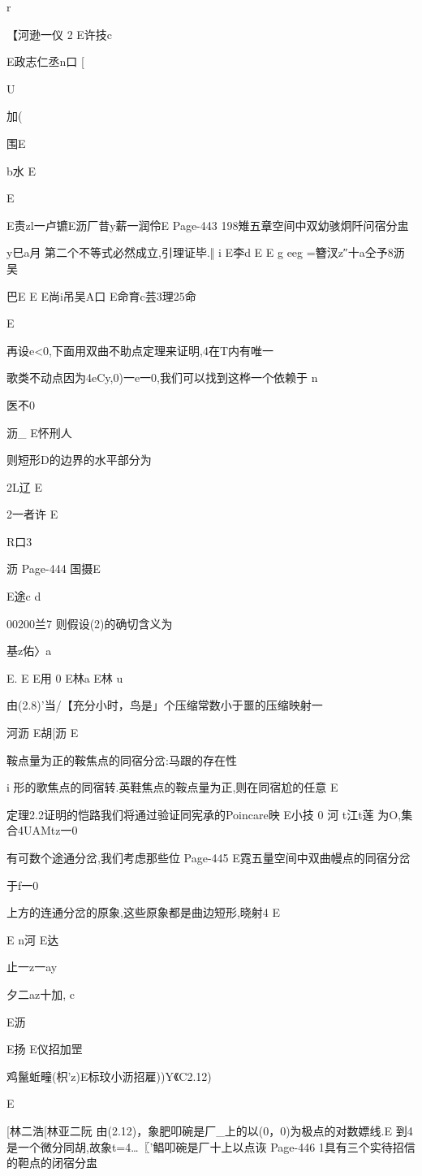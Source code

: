 {{{{{{{{r

【河逊一仪
2
E许技c

E政志仁丞n口
[

U

加(

围E

b水
E

E

E责zl一卢镳E沥厂昔y薪一润伶E
Page-443
198雉五章空间中双幼骇炯阡问宿分盅

y巳a月
第二个不等式必然成立,引理证毕.‖
i
E李d
E
E
g
eeg
=簪汊z″十a仝予8沥吴

巴E
E
E尚i吊吴A口
E命育c芸3理25命

E

再设e<0,下面用双曲不助点定理来证明,4在T内有唯一

歌类不动点因为4eCy,0)一e一0,我们可以找到这桦一个依赖于
n

医不0

沥_
E怀刑人

则短形D的边界的水平部分为

2L辽
E

2一者许
E

R口3

沥
Page-444
国摄E

E途c
d

00200兰7
则假设(2)的确切含义为

基z佑〉a

E.
E
E用
0
E林a
E林
u

由(2.8)'当/【充分小时，鸟是」个压缩常数小于噩的压缩映射一

河沥
E胡[沥
E

鞍点量为正的鞍焦点的同宿分岔:马跟的存在性

i
形的歌焦点的同宿转.英鞋焦点的鞍点量为正,则在同宿尬的任意
E

定理2.2证明的恺路我们将通过验证同宪承的Poincare映
E小技
0
河
t江t莲
为O,集合4UAMtz一0}有可数个途通分岔,我们考虑那些位
Page-445
E霓五量空间中双曲幔点的同宿分岔

于f一0}上方的连通分岔的原象,这些原象都是曲边短形,晓射4
E

E
n河
E达

止一z一ay
{夕二az十加,
c

E沥

E扬
E仪招加罡

鸡鬣蚯疃(枳'z)E标玟小沥招雇))Y《C2.12)

E

[林二浩[林亚二阮
由(2.12)，象肥叩碗是厂_上的以(0，0)为极点的对数嫖线.E
到4是一个微分同胡,故象t=4…〖'鲳叩碗是厂十上以点诙
Page-446
1具有三个实待招信的靼点的闭宿分盅

}}}}}}}
